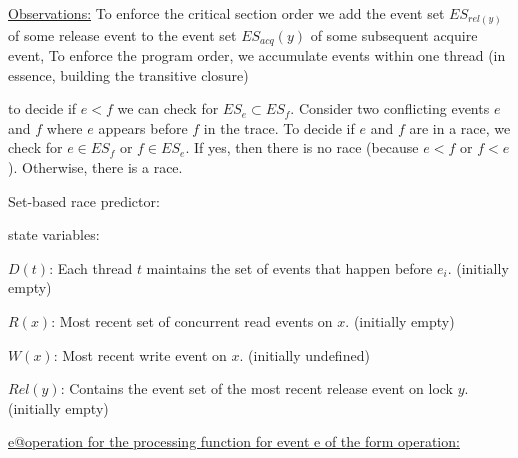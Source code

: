 \documentclass[landscape, a4paper]{article}
\begin{document}
\begin{minipage}[t]{0.2\linewidth}
\begin{betterlist}
\begin{betterlist}
			\begin{betterlist}
				\item \underline{Observations:} To enforce the critical section order we add the event set $ES_{rel(y)}$ of some release event to the event set $ES_{acq}(y)$ of some subsequent acquire event, To enforce the program order, we accumulate events within one thread (in essence, building the transitive closure)
				\item to decide if $e < f$ we can check for $ES_{e} \subset ES_{f}$. Consider two conflicting events $e$ and $f$ where $e$ appears before $f$ in the trace. To decide if $e$ and $f$ are in a race, we check for $e \in ES_f$ or $f \in ES_e$. If yes, then there is no race (because $e < f$ or $f < e$). Otherwise, there is a race.
				\item \alert{Set-based race predictor:}
				\begin{betterlist}
					\item \alert{state variables:}
					\begin{betterlist}
						\item $D(t)$: Each thread $t$ maintains the set of events that happen before $e_i$. (initially empty)
						\item $R(x)$: Most recent set of concurrent read events on $x$. (initially empty)
						\item $W(x)$: Most recent write event on $x$. (initially undefined)
						\item $Rel(y)$: Contains the event set of the most recent release event on lock $y$. (initially empty)
					\end{betterlist}
					\item \underline{e@operation for the \alert{processing function} for event e of the form operation:}


\end{betterlist}
\end{betterlist}
\end{betterlist}
\end{betterlist}
\end{minipage}
\end{document}
